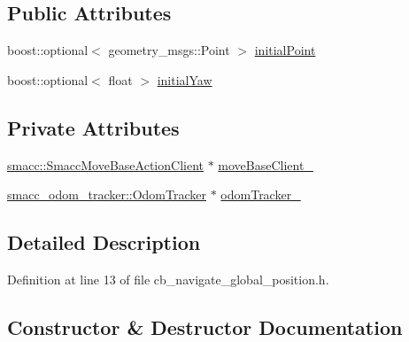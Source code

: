 \subsection*{Public Attributes}
\begin{DoxyCompactItemize}
\item 
boost\+::optional$<$ geometry\+\_\+msgs\+::\+Point $>$ \hyperlink{classsm__dance__bot_1_1CbNavigateGlobalPosition_a9b81342ca5492d3b9724c488c1f39f4f}{initial\+Point}
\item 
boost\+::optional$<$ float $>$ \hyperlink{classsm__dance__bot_1_1CbNavigateGlobalPosition_ad7ac13ee1b0f1a5dfdd47639930ab34c}{initial\+Yaw}
\end{DoxyCompactItemize}
\subsection*{Private Attributes}
\begin{DoxyCompactItemize}
\item 
\hyperlink{classsmacc_1_1SmaccMoveBaseActionClient}{smacc\+::\+Smacc\+Move\+Base\+Action\+Client} $\ast$ \hyperlink{classsm__dance__bot_1_1CbNavigateGlobalPosition_acaea61e5bdf69018d945f6c7025acfc0}{move\+Base\+Client\+\_\+}
\item 
\hyperlink{classsmacc__odom__tracker_1_1OdomTracker}{smacc\+\_\+odom\+\_\+tracker\+::\+Odom\+Tracker} $\ast$ \hyperlink{classsm__dance__bot_1_1CbNavigateGlobalPosition_a1d9fbebe8579cdef9485698e99ca8a41}{odom\+Tracker\+\_\+}
\end{DoxyCompactItemize}


\subsection{Detailed Description}


Definition at line 13 of file cb\+\_\+navigate\+\_\+global\+\_\+position.\+h.



\subsection{Constructor \& Destructor Documentation}
